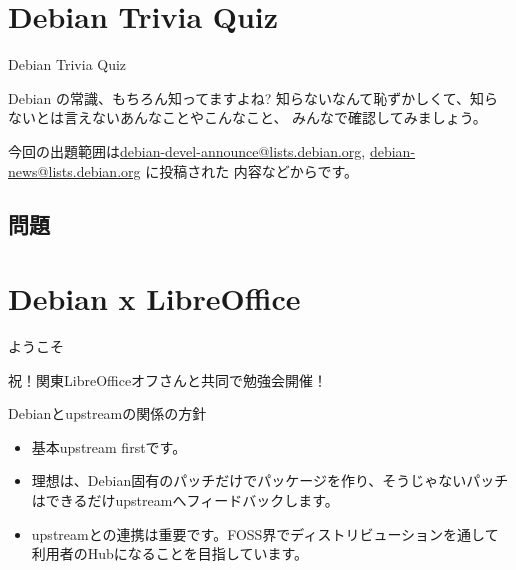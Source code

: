 \section{Debian Trivia Quiz}
\begin{frame}{Debian Trivia Quiz}

  Debian の常識、もちろん知ってますよね?
知らないなんて恥ずかしくて、知らないとは言えないあんなことやこんなこと、
みんなで確認してみましょう。

今回の出題範囲は\url{debian-devel-announce@lists.debian.org},
\url{debian-news@lists.debian.org} に投稿された
内容などからです。

\end{frame}

\subsection{問題}



\section{Debian x LibreOffice}

\begin{frame}{ようこそ}

 祝！関東LibreOfficeオフさんと共同で勉強会開催！

\end{frame}

\begin{frame}{Debianとupstreamの関係の方針}


\begin{itemize}
\item 基本upstream firstです。
\item 理想は、Debian固有のパッチだけでパッケージを作り、そうじゃないパッチはできるだけupstreamへフィードバックします。
\item upstreamとの連携は重要です。FOSS界でディストリビューションを通して利用者のHubになることを目指しています。
\end{itemize}

\end{frame}

